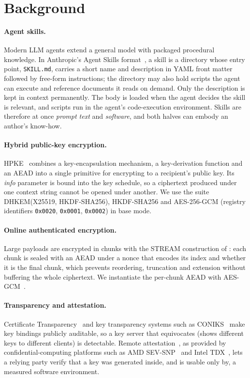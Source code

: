 \section{Background}
\label{sec:background}

\paragraph{Agent skills.}
Modern LLM agents extend a general model with packaged procedural knowledge. In Anthropic's Agent
Skills format~\citep{anthropic2025skillsblog,agentskills2026spec}, a skill is a directory whose entry point, \texttt{SKILL.md},
carries a short name and description in YAML front matter followed by free-form instructions; the
directory may also hold scripts the agent can execute and reference documents it reads on demand.
Only the description is kept in context permanently. The body is loaded when the agent decides the
skill is relevant, and scripts run in the agent's code-execution environment. Skills are therefore
at once \emph{prompt text} and \emph{software}, and both halves can embody an author's know-how.

\paragraph{Hybrid public-key encryption.}
HPKE~\citep{rfc9180} combines a key-encapsulation mechanism, a key-derivation function and an AEAD
into a single primitive for encrypting to a recipient's public key. Its \emph{info} parameter is
bound into the key schedule, so a ciphertext produced under one context string cannot be opened
under another. We use the suite DHKEM(X25519, HKDF-SHA256), HKDF-SHA256 and AES-256-GCM
(registry identifiers \texttt{0x0020}, \texttt{0x0001}, \texttt{0x0002}) in base mode.

\paragraph{Online authenticated encryption.}
Large payloads are encrypted in chunks with the STREAM construction of
\citet{hoang2015online}: each chunk is sealed with an AEAD under a nonce that encodes its index and
whether it is the final chunk, which prevents reordering, truncation and extension without buffering
the whole ciphertext. We instantiate the per-chunk AEAD with AES-GCM~\citep{dworkin2007gcm}.

\paragraph{Transparency and attestation.}
Certificate Transparency~\citep{rfc9162} and key transparency systems such as
CONIKS~\citep{melara2015coniks} make key bindings publicly auditable, so a key server that equivocates
(shows different keys to different clients) is detectable. Remote attestation~\citep{rfc9334}, as
provided by confidential-computing platforms such as AMD SEV-SNP~\citep{amd2020sevsnp} and Intel
TDX~\citep{intel2026tdx}, lets a relying party verify that a key was generated inside, and is
usable only by, a measured software environment.


